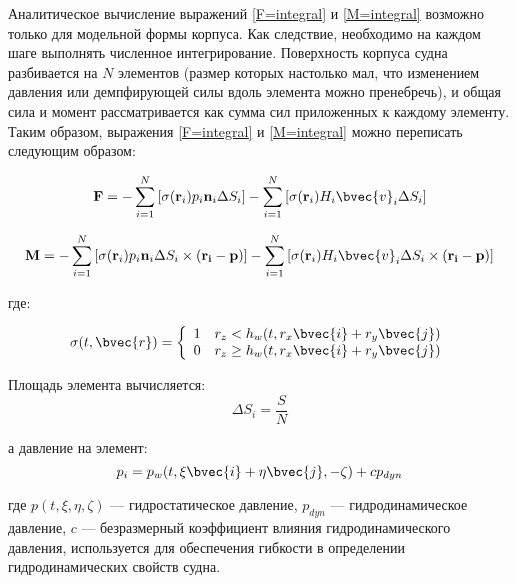 Аналитическое вычисление выражений \eqref{F=integral} и \eqref{M=integral} возможно только для модельной формы корпуса. Как следствие, необходимо на каждом шаге выполнять численное интегрирование. Поверхность корпуса судна разбивается на $N$ элементов (размер которых настолько мал, что изменением давления или демпфирующей силы вдоль элемента можно пренебречь), и общая сила и момент рассматривается как сумма сил приложенных к каждому элементу. Таким образом, выражения \eqref{F=integral} и \eqref{M=integral} можно переписать следующим образом:

\begin{equation}
	\mathbf{F} = 
		-\sum_{i=1}^{N} \left[
			\sigma (\mathbf{r}_i) p_i \mathbf{n}_i \Delta S_i
		\right]
		-\sum_{i=1}^{N} \left[
			\sigma (\mathbf{r}_i) H_i \bvec{v}_i \Delta S_i
		\right]
		\label{ship_math:force_sum}
\end{equation}

\begin{equation}
	\mathbf{M} = 
		-\sum_{i=1}^{N} \left[
			\sigma (\mathbf{r}_i) p_i \mathbf{n}_i \Delta S_i \times (\mathbf{r_i} - \mathbf{p})
		\right]
		-\sum_{i=1}^{N} \left[
			\sigma (\mathbf{r}_i) H_i \bvec{v}_i \Delta S_i \times (\mathbf{r_i} - \mathbf{p})
		\right]
		\label{ship_math:torque_sum}
\end{equation}

где:

\begin{equation}
  \sigma(t,\bvec{r}) = \left\{
  \begin{array}{l l}
    1 & r_z		< 		h_w (t, r_x \bvec{i} + r_y \bvec{j}) \\
    0 & r_z		\geq 	h_w (t, r_x \bvec{i} + r_y \bvec{j}) \\
  \end{array} \right.
\end{equation}

Площадь элемента вычисляется:
\begin{equation}
	\Delta S_i = \frac{S}{N}
\end{equation}

а давление на элемент:
\begin{equation}
	p_i = p_w(t, \xi \bvec{i} + \eta \bvec{j}, -\zeta) + c p_{dyn}
\end{equation}

где $p(t, \xi, \eta, \zeta)$ --- гидростатическое давление, $p_{dyn}$ --- гидродинамическое давление, $c$ --- безразмерный коэффициент влияния гидродинамического давления, используется для обеспечения гибкости в определении гидродинамических свойств судна.

